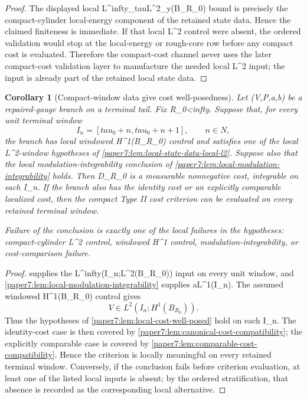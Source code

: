 \documentclass[11pt]{amsart}
\def\({}%
\def\){}%
\def\tilde#1{#1}%
\def\mathfrak#1{#1}%
\def\mathbb#1{#1}%
\def\tau{tau}%
\def\infty{infty}%
\theoremstyle{plain}
\newtheorem{corollary}[corollary]{Corollary}
\theoremstyle{definition}
\theoremstyle{remark}
\begin{document}
\begin{proof}
The displayed local \(L^\infty_\tau L^2_y(B_{R_0})\) bound is precisely the
compact-cylinder local-energy component of the retained state data.  Hence the
claimed finiteness is immediate.  If that local \(L^2\) control were absent,
the ordered validation would stop at the local-energy or rough-core row before
any compact cost is evaluated.  Therefore the compact-cost channel never uses
the later compact-cost validation layer to manufacture the needed local \(L^2\)
input; the input is already part of the retained local state data.
\end{proof}

\begin{corollary}[Compact-window data give cost well-posedness]
\label{paper7:cor:compact-window-data-cost-well-posed}
Let \((V,P,a,b)\) be a repaired-gauge branch on a terminal tail.  Fix
\(R_0<\infty\).  Suppose that, for every unit terminal window
\[
  I_n=[\tau_0+n,\tau_0+n+1],
  \qquad n\in\mathbb N,
\]
the branch has local windowed \(H^1(B_{R_0})\) control and satisfies one of
the local \(L^2\)-window hypotheses of
\cref{paper7:lem:local-state-data-local-l2}.  Suppose also that the local
modulation-integrability conclusion of
\cref{paper7:lem:local-modulation-integrability} holds.  Then
\(\tilde{\mathfrak D}_{R_0}\) is a measurable nonnegative cost, integrable
on each \(I_n\).  If the branch also has the identity cost or an explicitly
comparable localized cost, then the compact Type II cost criterion can be
evaluated on every retained terminal window.
\par
Failure of the conclusion is exactly one of the local failures in the
hypotheses: compact-cylinder \(L^2\) control, windowed \(H^1\) control,
modulation-integrability, or cost-comparison failure.
\end{corollary}

\begin{proof}
 supplies the
\(L^\infty(I_n;L^2(B_{R_0}))\) input on every unit window, and
\cref{paper7:lem:local-modulation-integrability} supplies \(a\in L^1(I_n)\).
The assumed windowed \(H^1(B_{R_0})\) control gives
\[
  V\in L^2(I_n;H^1(B_{R_0})).
\]
Thus the hypotheses of \cref{paper7:lem:local-cost-well-posed} hold on each
\(I_n\).  The identity-cost case is then covered by
\cref{paper7:lem:canonical-cost-compatibility}; the explicitly comparable case
is covered by \cref{paper7:lem:comparable-cost-compatibility}.  Hence the
criterion is locally meaningful on every retained terminal window.  Conversely,
if the conclusion fails before criterion evaluation, at least one of the listed
local inputs is absent; by the ordered stratification, that absence is recorded
as the corresponding local alternative.
\end{proof}
\end{document}
